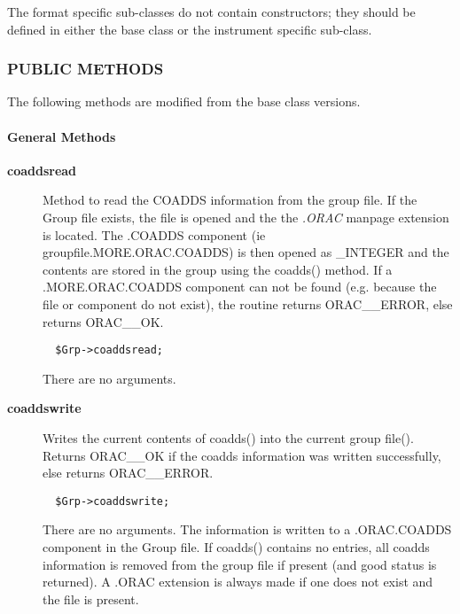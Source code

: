 The format specific sub-classes do not contain constructors; they 
should be defined in either the base class or the instrument specific
sub-class.

\subsubsection*{PUBLIC METHODS\label{ORAC::Group::NDF_PUBLIC_METHODS}}

The following methods are modified from the base class versions.

\paragraph*{General Methods\label{ORAC::Group::NDF_General_Methods}}\begin{description}
\item[\textbf{coaddsread}] \mbox{}

Method to read the COADDS information from the group file. If the
Group file exists, the file is opened and the the \emph{.ORAC} manpage extension is
located. The .COADDS component (ie groupfile.MORE.ORAC.COADDS) is then
opened as \_INTEGER and the contents are stored in the group using the
coadds() method. If a .MORE.ORAC.COADDS component can not be found (e.g.
because the file or component do not exist), the routine returns
ORAC\_\_ERROR, else returns ORAC\_\_OK.

\begin{verbatim}
  $Grp->coaddsread;
\end{verbatim}


There are no arguments.

\item[\textbf{coaddswrite}] \mbox{}

Writes the current contents of coadds() into the current group file().
Returns ORAC\_\_OK if the coadds information was written successfully,
else returns ORAC\_\_ERROR.

\begin{verbatim}
  $Grp->coaddswrite;
\end{verbatim}


There are no arguments. The information is written to a .ORAC.COADDS
component in the Group file.  If coadds() contains no entries, all
coadds information is removed from the group file if present (and good
status is returned). A .ORAC extension is always made if one does not
exist and the file is present.


\end{description}

